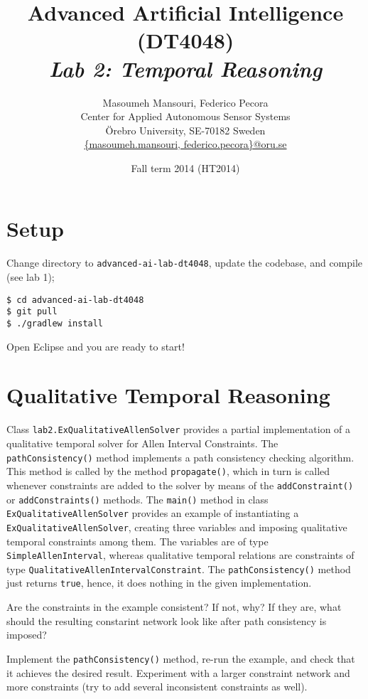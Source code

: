 \documentclass[a4paper]{article}
\title{Advanced Artificial Intelligence (DT4048)\\{\em Lab 2: Temporal Reasoning}}
\author{Masoumeh Mansouri, Federico Pecora\\Center for Applied Autonomous Sensor Systems\\\"Orebro University, SE-70182 Sweden\\\url{{masoumeh.mansouri, federico.pecora}@oru.se}}
\date{Fall term 2014 (HT2014)}
\begin{document}
\maketitle

\section{Setup}

Change directory to {\tt advanced-ai-lab-dt4048}, update the codebase, and compile (see lab 1);

\begin{lstlisting}
$ cd advanced-ai-lab-dt4048
$ git pull
$ ./gradlew install
\end{lstlisting}

Open Eclipse and you are ready to start!

\section{Qualitative Temporal Reasoning}

Class {\tt lab2.ExQualitativeAllenSolver} provides a partial implementation of a qualitative temporal solver for Allen Interval Constraints.  The {\tt pathConsistency()} method implements a path consistency checking algorithm.  This method is called by the method {\tt propagate()}, which in turn is called whenever constraints are added to the solver by means of the {\tt addConstraint()} or {\tt addConstraints()} methods. The {\tt main()} method in class {\tt ExQualitativeAllenSolver} provides an example of instantiating a {\tt ExQualitativeAllenSolver}, creating three variables and imposing qualitative temporal constraints among them.  The variables are of type {\tt SimpleAllenInterval}, whereas qualitative temporal relations are constraints of type {\tt QualitativeAllenIntervalConstraint}.  The {\tt pathConsistency()} method just returns {\tt true}, hence, it does nothing in the given implementation.

{\ex{}\label{ex:ex1}  Are the constraints in the example consistent?  If not, why?  If they are, what should the resulting constarint network look like after path consistency is imposed?\vspace{0.1cm}}

{\ex{}\label{ex:ex2} Implement the {\tt pathConsistency()} method, re-run the example, and check that it achieves the desired result.  Experiment with a larger constraint network and more constraints (try to add several inconsistent constraints as well). \vspace{0.1cm}}
\end{document}
